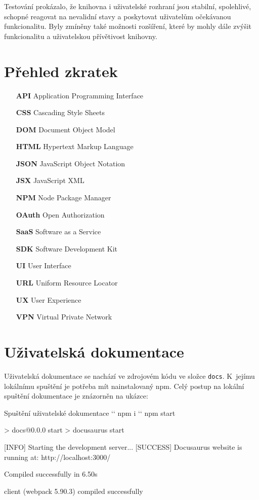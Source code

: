 \documentclass[czech, bc, kiv, he, iso690numb, viewonly]{fasthesis} %
\begin{document}
Testování prokázalo, že knihovna i uživatelské rozhraní jsou stabilní, spolehlivé, schopné reagovat na nevalidní stavy a poskytovat uživatelům očekávanou funkcionalitu. Byly zmíněny 
také možnosti rozšíření, které by mohly dále zvýšit funkcionalitu a uživatelskou přívětivost knihovny.

\chapter*{Přehled zkratek}

\begin{itemize}[align=left, labelwidth=1.5cm, labelsep=10pt, leftmargin=!]
    \item[\textbf{API}]    Application Programming Interface  
    \item[\textbf{CSS}]	 Cascading Style Sheets
    \item[\textbf{DOM}] 	Document Object Model
    \item[\textbf{HTML}]  Hypertext Markup Language
    \item[\textbf{JSON}]  JavaScript Object Notation
    \item[\textbf{JSX}] JavaScript XML
    \item[\textbf{NPM}] Node Package Manager
    \item[\textbf{OAuth}] Open Authorization
    \item[\textbf{SaaS}]  Software as a Service
    \item[\textbf{SDK}]    Software Development Kit
    \item[\textbf{UI}]        User Interface
    \item[\textbf{URL}] Uniform Resource Locator
    \item[\textbf{UX}]        User Experience
    \item[\textbf{VPN}]        Virtual Private Network
\end{itemize}

\appendix
\chapter{Uživatelská dokumentace}\label{app:docuDocs}
Uživatelská dokumentace se nachází ve zdrojovém kódu ve složce \texttt{docs}. K~jejímu lokálnímu spuštění je potřeba mít nainstalovaný npm.
Celý postup na lokální spuštění dokumentace je znázorněn na ukázce:

\begin{console}{Spuštění uživatelské dokumentace}
`\winprompt` npm i
`\winprompt` npm start

> docs@0.0.0 start
> docusaurus start

[INFO] Starting the development server...
[SUCCESS] Docusaurus website is running at: http://localhost:3000/

 Compiled successfully in 6.50s

client (webpack 5.90.3) compiled successfully
\end{console}
\end{document}
